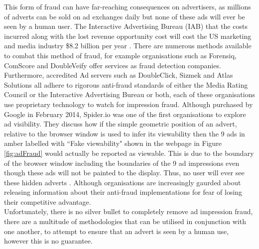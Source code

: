 \documentclass[12pt]{article}
\begin{document}
This form of fraud can have far-reaching consequences on advertisers, as millions of adverts can be sold on ad exchanges daily but none of these ads will ever be seen by a human user. The Interactive Advertising Bureau (IAB) that the costs incurred along with the lost revenue opportunity cost will cost the US marketing and media industry \$8.2 billion per year \parencite{iabfraud}. There are numerous methods available to combat this method of fraud, for example organisations such as Forensiq, ComScore and DoubleVeify offer services as fraud detection companies. Furthermore, accredited Ad servers such as DoubleClick, Sizmek and Atlas Solutions all adhere to rigorous anti-fraud standards of either the Media Rating Council or the Interactive Advertising Bureau or both, each of these organisations use proprietary technology to watch for impression fraud. Although purchased by Google in February 2014, Spider.io was one of the first organisations to explore ad visibility. They discuss how if the simple geometric position of an advert, relative to the browser window is used to infer its viewability then the 9 ads in amber labelled with ``Fake viewability" shown in the webpage in Figure \ref{fig:adFraud} would actually be reported as viewable. This is due to the boundary of the browser window including the boundaries of the 9 ad impressions even though these ads will not be painted to the display. Thus, no user will ever see these hidden adverts \parencite{spiderIo}. Although organisations are increasingly gaurded about releasing information about their anti-fraud implementations for fear of losing their competitive advantage.  \\ 


Unfortunately, there is no silver bullet to completely remove ad impression fraud, there are a multitude of methodologies that can be utilised in conjunction with one another, to attempt to ensure that an advert is seen by a human use, however this is no guarantee. 
\end{document}
